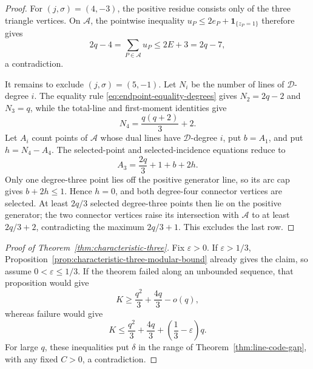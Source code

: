 \begin{proof}
For \((j,\sigma)=(4,-3)\), the positive residue consists only of the three
triangle vertices.  On \(\mathcal A\), the pointwise inequality
\(u_P\le2e_P+\mathbf1_{\{z_P=1\}}\) therefore gives
\[
 2q-4=\sum_{P\in\mathcal A}u_P\le2E+3=2q-7,
\]
a contradiction.

It remains to exclude \((j,\sigma)=(5,-1)\).  Let \(N_i\) be the number of
lines of \(\mathcal D\)-degree \(i\).  The equality rule
\eqref{eq:endpoint-equality-degrees} gives
\(N_2=2q-2\) and \(N_3=q\), while the total-line and first-moment identities
give
\[
 N_4=\frac{q(q+2)}3+2.
\]
Let \(A_i\) count points of \(\mathcal A\) whose dual lines have
\(\mathcal D\)-degree \(i\), put \(b=A_1\), and put \(h=N_4-A_4\).
The selected-point and selected-incidence equations reduce to
\[
 A_3=\frac{2q}{3}+1+b+2h.
\]
Only one degree-three point lies off the positive generator line, so its arc
cap gives \(b+2h\le1\).  Hence \(h=0\), and both degree-four connector
vertices are selected.  At least \(2q/3\) selected degree-three points then
lie on the positive generator; the two connector vertices raise its
intersection with \(\mathcal A\) to at least \(2q/3+2\), contradicting the
maximum \(2q/3+1\).  This excludes the last row.
\end{proof}

\begin{proof}[Proof of Theorem~\ref{thm:characteristic-three}]
Fix \(\varepsilon>0\).  If \(\varepsilon>1/3\),
Proposition~\ref{prop:characteristic-three-modular-bound} already gives the
claim, so assume \(0<\varepsilon\le1/3\).  If the theorem failed along an
unbounded sequence, that proposition would give
\[
 K\ge \frac{q^2}{3}+\frac{4q}{3}-o(q),
\]
whereas failure would give
\[
 K\le \frac{q^2}{3}+\frac{4q}{3}
       +\left(\frac13-\varepsilon\right)q.
\]
For large \(q\), these inequalities put \(\delta\) in the range of
Theorem~\ref{thm:line-code-gap}, with any fixed \(C>0\), a contradiction.
\end{proof}

